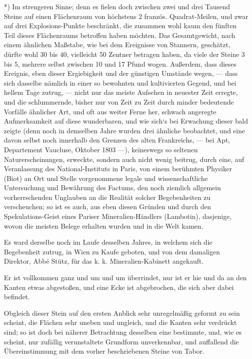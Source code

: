 \documentclass[a4paper, 11pt, oneside, german]{article}
\begin{document}
*) Im strengeren Sinne; denn es fielen doch zwischen zwei und drei Tausend Steine auf einen Flächenraum von höchstens 2 französ. Quadrat-Meilen, und zwar auf drei Explosions-Punkte beschränkt, die zusammen wohl kaum den fünften Teil dieses Flächenraums betroffen haben möchten. Das Gesamtgewicht, nach einem ähnlichen Maßstabe, wie bei dem Ereignisse von Stannern, geschätzt, dürfte wohl 30 bis 40, vielleicht 50 Zentner betragen haben, da viele der Steine 3 bis 5, mehrere selbst zwischen 10 und 17 Pfund wogen. Außerdem, dass dieses Ereignis, eben dieser Ergiebigkeit und der günstigen Umstände wegen, --- dass sich dasselbe nämlich in einer so bewohnten und kultivierten Gegend, und bei hellem Tage zutrug, --- nicht nur das meiste Aufsehen in neuester Zeit erregte, und die schlummernde, bisher nur von Zeit zu Zeit durch minder bedeutende Vorfälle ähnlicher Art, und oft aus weiter Ferne her, schwach angeregte Aufmerksamkeit auf diese wunderbaren, und wie sich‘s bei Erwachung dieser bald zeigte (denn noch in demselben Jahre wurden drei ähnliche beobachtet, und eine davon selbst noch innerhalb den Grenzen des alten Frankreichs, --- bei Apt, Departement Vaucluse, Oktober 1803 ---), keineswegs so seltenen Naturerscheinungen, erweckte, sondern auch nicht wenig beitrug, durch eine, auf Veranlassung des National-Instituts in Paris, von einem berühmten Physiker (Biot) an Ort und Stelle vorgenommene legale und wissenschaftliche Untersuchung und Bewährung des Factums, den noch ziemlich allgemein vorherrschenden Unglauben an die Realität solcher Begebenheiten zu verscheuchen; so ist es auch, aus eben diesen Gründen und durch den Spekulations-Geist eines Pariser Mineralien-Händlers (Lambotin), dasjenige, wovon die meisten Belege erhalten wurden und in die Welt kamen.

Es ward derselbe noch im Laufe desselben Jahres, in welchem sich die Begebenheit zutrug, in Wien zu Kaufe geboten, und von dem damaligen Direktor, Abbé Stütz, für das k. k. Mineralien-Kabinett angekauft.

Er ist vollkommen ganz und um und um überrindet, nur ist er hie und da an den Kanten etwas abgestoßen, und eine Ecke ist abgebrochen, die sich aber dabei befindet.

Obgleich dieser Stein auf den ersten Anblick sehr unregelmäßig geformt zu sein scheint, die Flächen sehr uneben und ungleich, und die Kanten sehr verdrückt sind; so ist doch bei näherer Betrachtung desselben eine bestimmte, und, wie es scheint, nur zufällig verunstaltete Grundform unverkennbar, und auffallend die Übereinstimmung mit dem vorher beschriebenen Steine von Tabor.
\end{document}
